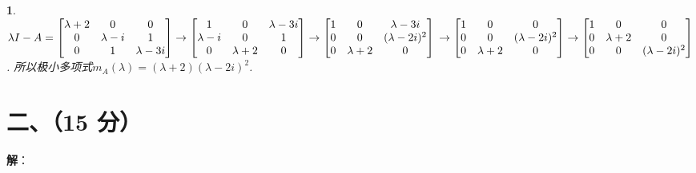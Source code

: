 \documentclass[11pt, a4paper]{article}
\newtheorem{lt}{}
\begin{document}
\begin{lt}
$\lambda I-A = \begin{bmatrix}
\lambda+2&0&0\\
0&\lambda-i&1\\
0&1&\lambda-3i
\end{bmatrix}
\rightarrow
\begin{bmatrix}
1&0&\lambda-3i\\
\lambda-i&0&1\\
0&\lambda+2&0
\end{bmatrix}
\rightarrow
\begin{bmatrix}
1&0&\lambda-3i\\
0&0&(\lambda-2i)^2\\
0&\lambda+2&0
\end{bmatrix}\\
\rightarrow
\begin{bmatrix}
1&0&0\\
0&0&(\lambda-2i)^2\\
0&\lambda+2&0
\end{bmatrix}
\rightarrow
\begin{bmatrix}
1&0&0\\
0&\lambda+2&0\\
0&0&(\lambda-2i)^2
\end{bmatrix}$.
所以极小多项式$m_A(\lambda)=(\lambda+2)(\lambda-2i)^2$.
\end{lt}

\section*{二、（15 分）}
\textbf{解}：
\end{document}

